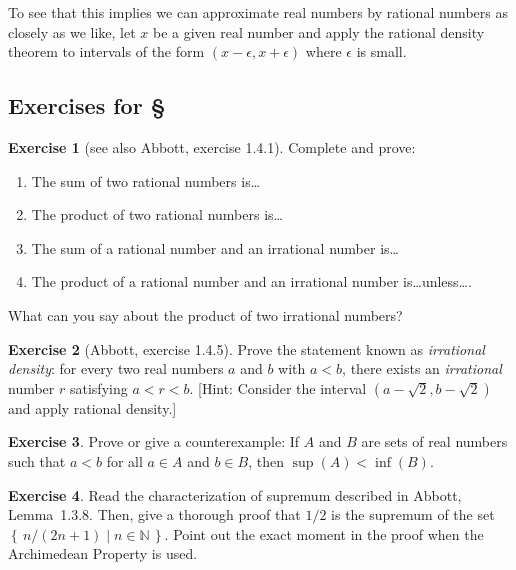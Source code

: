 \documentclass[11pt,oneside]{amsbook}
\newcommand{\set}[1]{\left\{\,#1\,\right\}}
\newcommand{\N}{\mathbb N}
\theoremstyle{definition}
\newtheorem{exerc}{Exercise}[section]
\theoremstyle{plain}
\theoremstyle{definition}
\theoremstyle{remark}
\numberwithin{equation}{section}
\numberwithin{figure}{section}
\begin{document}
To see that this implies we can approximate real numbers by rational numbers as closely as we like, let $x$ be a given real number and apply the rational density theorem to intervals of the form $(x-\epsilon,x+\epsilon)$ where $\epsilon$ is small.

\newpage
\subsection*{Exercises for \S\thesection}


\begin{exerc}[see also Abbott, exercise 1.4.1]
  Complete and prove:
  \begin{enumerate}
    \item The sum of two rational numbers is\ldots
    \item The product of two rational numbers is\ldots
    \item The sum of a rational number and an irrational number is\ldots
    \item The product of a rational number and an irrational number is\ldots unless\ldots.
  \end{enumerate}
  What can you say about the product of two irrational numbers?
\end{exerc}

\begin{exerc}[Abbott, exercise 1.4.5]
  Prove the statement known as \emph{irrational density}: for every two real numbers $a$ and $b$ with $a<b$, there exists an \emph{irrational} number $r$ satisfying $a<r<b$. [Hint: Consider the interval $(a-\sqrt{2},b-\sqrt{2})$ and apply rational density.]
\end{exerc}

\begin{exerc}
  Prove or give a counterexample: If $A$ and $B$ are sets of real numbers such that $a<b$ for all $a\in A$ and $b\in B$, then $\sup(A)<\inf(B)$.
\end{exerc}

\begin{exerc}
  Read the characterization of supremum described in Abbott, Lemma~1.3.8. Then, give a thorough proof that $1/2$ is the supremum of the set $\set{n/(2n+1)\mid n\in\N}$. Point out the exact moment in the proof when the Archimedean Property is used.
\end{exerc}
\end{document}
